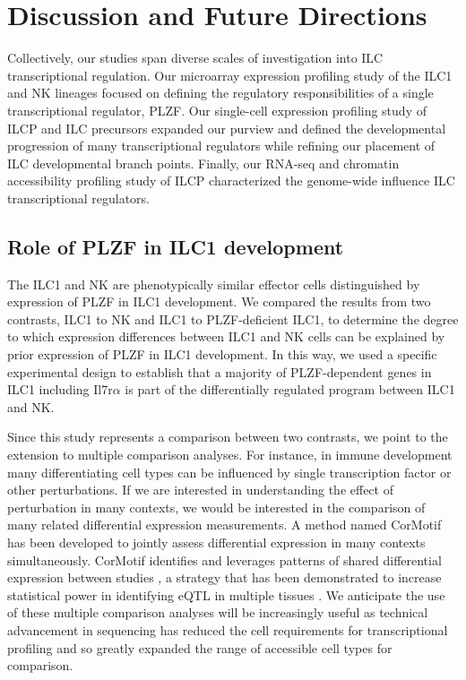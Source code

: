 

\chapter{Discussion and Future Directions}

Collectively, our studies span diverse scales of investigation into ILC transcriptional regulation. Our microarray expression profiling study of the ILC1 and NK lineages focused on defining the regulatory responsibilities of a single transcriptional regulator, PLZF. Our single-cell expression profiling study of ILCP and \ab\UP{} ILC precursors expanded our purview and defined the developmental progression of many transcriptional regulators while refining our placement of ILC developmental branch points. Finally, our RNA-seq and chromatin accessibility profiling study of ILCP characterized the genome-wide influence ILC transcriptional regulators. 

\section{Role of PLZF in ILC1 development}

The ILC1 and NK are phenotypically similar effector cells distinguished by expression of PLZF in ILC1 development. We compared the results from two contrasts, ILC1 to NK and ILC1 to PLZF-deficient ILC1, to determine the degree to which expression differences between ILC1 and NK cells can be explained by prior expression of PLZF in ILC1 development. In this way, we used a specific experimental design to establish that a majority of PLZF-dependent genes in ILC1 including Il7r$\alpha$ is part of the differentially regulated program between ILC1 and NK. 

Since this study represents a comparison between two contrasts, we point to the extension to multiple comparison analyses. For instance, in immune development many differentiating cell types can be influenced by single transcription factor or other perturbations. If we are interested in understanding the effect of perturbation in many contexts, we would be interested in the comparison of many related differential expression measurements. A method named CorMotif has been developed to jointly assess differential expression in many contexts simultaneously. CorMotif identifies and leverages patterns of shared differential expression between studies \cite{wei2014}, a strategy that has been demonstrated to increase statistical power in identifying eQTL in multiple tissues \cite{flutre2013}. We anticipate the use of these multiple comparison analyses will be increasingly useful as technical advancement in sequencing has reduced the cell requirements for transcriptional profiling and so greatly expanded the range of accessible cell types for comparison.

